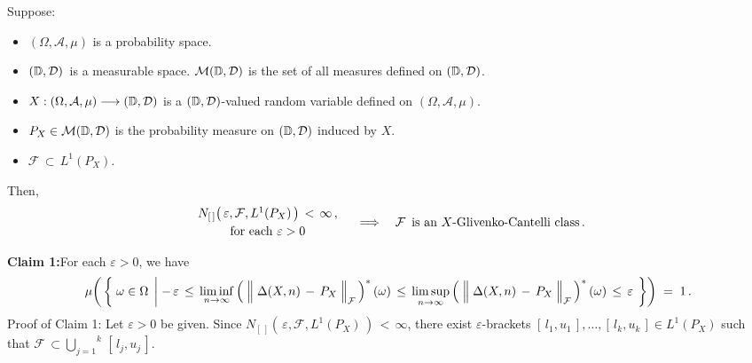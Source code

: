 
\begin{theorem}
\mbox{}\vskip 0.1cm
\noindent
Suppose:
\begin{itemize}
\item
	$(\Omega,\mathcal{A},\mu)$ is a probability space.
\item
	$(\mathbb{D},\mathcal{D})$\, is a measurable space.
	$\mathcal{M}(\mathbb{D},\mathcal{D})$ is the set of all measures defined on $(\mathbb{D},\mathcal{D})$.
\item
	$X : (\Omega,\mathcal{A},\mu) \longrightarrow (\mathbb{D},\mathcal{D})$
	is a $(\mathbb{D},\mathcal{D})$-valued random variable defined on
	$(\Omega,\mathcal{A},\mu)$.
\item
	$P_{X} \in \mathcal{M}(\mathbb{D},\mathcal{D})$ is the probability measure
	on $(\mathbb{D},\mathcal{D})$ induced by $X$.
\item
	$\mathcal{F} \,\subset\, L^{1}(P_{X})$.
\end{itemize}
Then,
\begin{equation*}
	\begin{array}{c}
	N_{[\,]}\!\left(\,\varepsilon,\mathcal{F},L^{1}(P_{X})\,\right) \,<\, \infty\,, \\
	\overset{{\color{white}.}}{\textnormal{for each $\varepsilon > 0$}}
	\end{array}
\quad\Longrightarrow\quad
	\textnormal{$\mathcal{F}$\, is an $X$-Glivenko-Cantelli class}\,.
\end{equation*}
\end{theorem}
\proof
\vskip 0.3cm
\noindent
\textbf{Claim 1:}\quad For each $\varepsilon > 0$, we have
\begin{equation*}
\mu\!\left(\,\left\{\;
	\omega\in\Omega
\;\left\vert\;
	-\,\varepsilon
	\,\leq\,
	\underset{n\rightarrow\infty}{\liminf}
	\left(\;\left\Vert\;\Delta(X,n) \,\overset{{\color{white}.}}{-}\, P_{X}\;\right\Vert_{\mathcal{F}}\,\right)^{*}(\omega)
	\,\leq\,
	\underset{n\rightarrow\infty}{\limsup}
	\left(\;\left\Vert\;\Delta(X,n) \,\overset{{\color{white}.}}{-}\, P_{X}\;\right\Vert_{\mathcal{F}}\,\right)^{*}(\omega)
	\,\leq\,
	\varepsilon
\right.
\;\right\}\right)
\;=\; 1\,.
\end{equation*}
Proof of Claim 1:\quad
Let $\varepsilon > 0$ be given.
Since $N_{[\,]}\!\left(\,\varepsilon,\mathcal{F},L^{1}(P_{X})\,\right) \,<\, \infty$,
there exist $\varepsilon$-brackets $[\,l_{1},u_{1}\,],\ldots,[\,l_{k},u_{k}\,]\in L^{1}(P_{X})$
such that $\mathcal{F} \,\subset \overset{k}{\underset{j=1}{\bigcup}}\,[\,l_{j},u_{j}\,]$.
